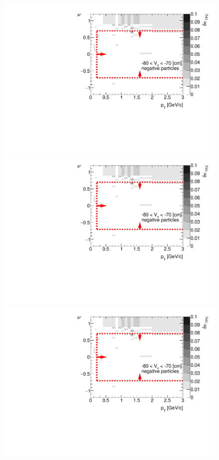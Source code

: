 \begin{figure}[H]
{	}~
	\parbox{0.325\textwidth}{
		\includegraphics[width=\linewidth,page=18]{graphics/systematicsEfficiency/deadMaterial/secondaries_Unbinned_Charged_SDCD.pdf}\\
		\includegraphics[width=\linewidth,page=21]{graphics/systematicsEfficiency/deadMaterial/secondaries_Unbinned_Charged_SDCD.pdf}\\
		\includegraphics[width=\linewidth,page=24]{graphics/systematicsEfficiency/deadMaterial/secondaries_Unbinned_Charged_SDCD.pdf}\\
}
\end{figure}
